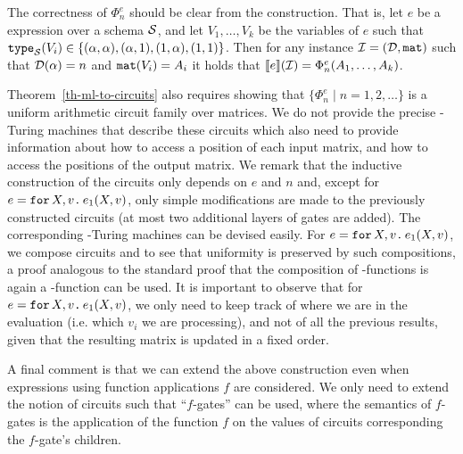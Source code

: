 The correctness of  $\Phi_n^e$ should be clear from the construction. That is, let $e$ be a \langfor expression over  a schema $\mathcal{S}$, and  let $V_1,\ldots ,V_k$ be the variables of $e$ such that $\texttt{type}_{\mathcal{S}}(V_i)\in \{(\alpha,\alpha),\allowbreak (\alpha,1), (1,\alpha), (1,1)\}$. Then 
for any instance $\mathcal{I} = (\mathcal{D},\texttt{mat})$ such that $\mathcal{D}(\alpha) = n$ and $\texttt{mat}(V_i) = A_i$ it holds that $\llbracket e \rrbracket(\mathcal{I}) = \Phi_n^e(A_1,\ldots ,A_k)$.

%
Theorem~\ref{th-ml-to-circuits} also requires showing that $\{\Phi_n^e \mid n=1,2,\ldots\}$ is a uniform arithmetic circuit family over matrices.
We do not provide the precise \logspace-Turing machines that describe these circuits which also need to provide information about how to access a position of each input matrix, and how to access the positions of the output matrix. We remark that the inductive construction of the circuits only depends on $e$ and $n$ and,
except for  $e=\texttt{for}\, X,v \texttt{.}\, e_1(X, v)$, only simple modifications are made to the previously constructed circuits (at most two additional layers of gates are added).
The corresponding  \logspace-Turing machines can be devised easily. For  $e=\texttt{for}\, X,v \texttt{.}\, e_1(X, v)$, we compose circuits and to see that uniformity is preserved by such compositions, a proof analogous to the standard proof that the composition of \logspace-functions is again a \logspace-function  \cite{aroraB2009} can be used. It is important to observe that for $e=\texttt{for}\, X,v \texttt{.}\, e_1(X, v)$, we only need to keep track of where we are in the evaluation (i.e. which $v_i$ we are processing), and not of all the previous results, given that the resulting matrix is updated in a fixed order.

A final comment is that we can extend the above construction even when \langfor expressions using function applications $f$ are considered. We only need to extend
the notion of circuits such that ``$f$-gates'' can be used, where the semantics of $f$-gates is the application of the function $f$ on the values of circuits
corresponding the $f$-gate's children.

